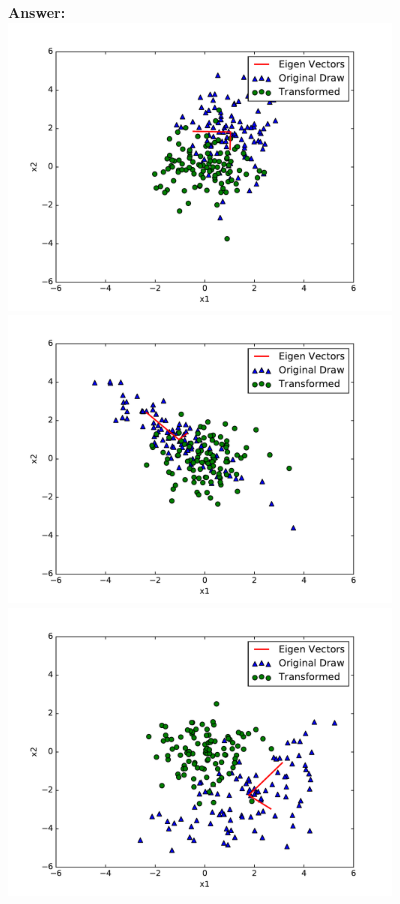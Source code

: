 \documentclass{article}
\newcommand{\1}{\mathbf{1}}
\begin{document}
\textbf{Answer:}\\

 \includegraphics[width=4in]{GaussianDraws0.pdf}\\
  \includegraphics[width=4in]{GaussianDraws1.pdf}\\
 \includegraphics[width=4in]{GaussianDraws2.pdf}\\
 
\end{document}
